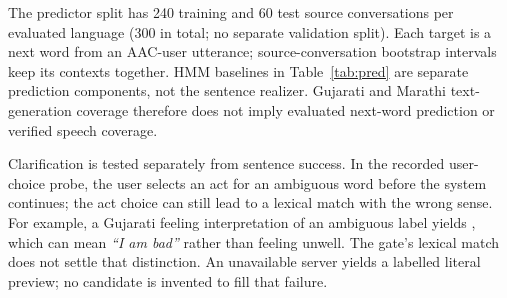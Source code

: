 The predictor split has 240 training and 60 test source conversations per evaluated language (300 in total; no separate validation split).
Each target is a next word from an AAC-user utterance; source-conversation bootstrap intervals keep its contexts together.
HMM baselines in Table~\ref{tab:pred} are separate prediction components, not the sentence realizer.
Gujarati and Marathi text-generation coverage therefore does not imply evaluated next-word prediction or verified speech coverage.

Clarification is tested separately from sentence success.
In the recorded user-choice probe, the user selects an act for an ambiguous word before the system continues; the act choice can still lead to a lexical match with the wrong sense.
For example, a Gujarati feeling interpretation of an ambiguous label yields , which can mean \emph{“I am bad”} rather than feeling unwell.
The gate's lexical match does not settle that distinction.
An unavailable server yields a labelled literal preview; no candidate is invented to fill that failure.
